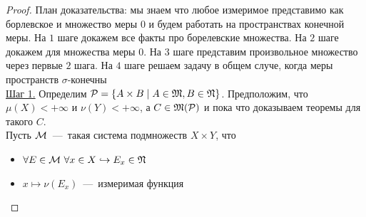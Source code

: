 \begin{proof}
    План доказательства: мы знаем что любое измеримое представимо как борлевское и множество меры 0 и будем работать на пространствах конечной меры. На $1$ шаге докажем все факты про борелевские множества. На $2$ шаге докажем для множества меры $0$. На $3$ шаге представим произвольное множество через первые $2$ шага. На $4$ шаге решаем задачу в общем случе, когда меры пространств $\sigma$-конечны \\
    \underline{Шаг 1.} Определим $\mathcal{P} = \{A \times B \mid A \in \mathfrak{M}, B \in \mathfrak{N} \}$. Предположим, что $\mu(X) < +\infty$ и $\nu(Y) < +\infty$, а $C \in \mathfrak{M}(\mathcal{P})$ и пока что доказываем теоремы для такого $C$.\\
    Пусть $\mathcal{M}$~---~такая система подмножеств $X \times Y$, что \begin{itemize}
        \item $\forall E \in \mathcal{M} \  \forall x \in X \hookrightarrow E_x \in \mathfrak{N}$
        \item $x \mapsto \nu(E_x)$~---~измеримая функция
    \end{itemize}


\end{proof}
